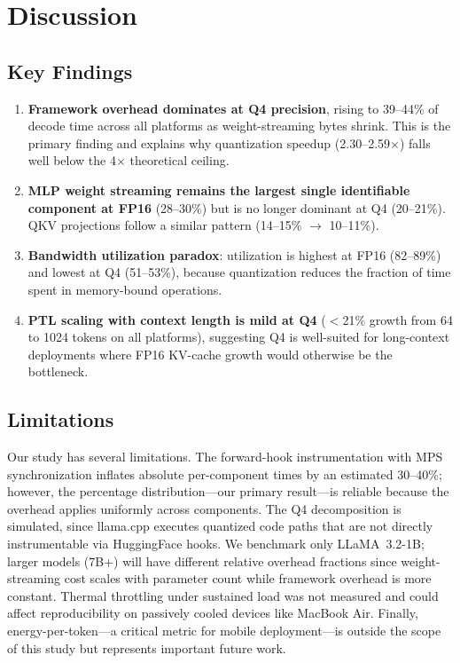 \documentclass[conference]{IEEEtran}
\begin{document}
\section{Discussion}

\subsection{Key Findings}

\begin{enumerate}
  \item \textbf{Framework overhead dominates at Q4 precision}, rising to 39--44\% of decode time across all platforms as weight-streaming bytes shrink. This is the primary finding and explains why quantization speedup (2.30--2.59$\times$) falls well below the 4$\times$ theoretical ceiling.

  \item \textbf{MLP weight streaming remains the largest single identifiable component at FP16} (28--30\%) but is no longer dominant at Q4 (20--21\%). QKV projections follow a similar pattern (14--15\% $\rightarrow$ 10--11\%).

  \item \textbf{Bandwidth utilization paradox}: utilization is highest at FP16 (82--89\%) and lowest at Q4 (51--53\%), because quantization reduces the fraction of time spent in memory-bound operations.

  \item \textbf{PTL scaling with context length is mild at Q4} ($<$21\% growth from 64 to 1024 tokens on all platforms), suggesting Q4 is well-suited for long-context deployments where FP16 KV-cache growth would otherwise be the bottleneck.
\end{enumerate}

\subsection{Limitations}

Our study has several limitations. The forward-hook instrumentation with MPS synchronization inflates absolute per-component times by an estimated 30--40\%; however, the percentage distribution---our primary result---is reliable because the overhead applies uniformly across components. The Q4 decomposition is simulated, since llama.cpp executes quantized code paths that are not directly instrumentable via HuggingFace hooks. We benchmark only LLaMA~3.2-1B; larger models (7B+) will have different relative overhead fractions since weight-streaming cost scales with parameter count while framework overhead is more constant. Thermal throttling under sustained load was not measured and could affect reproducibility on passively cooled devices like MacBook Air. Finally, energy-per-token---a critical metric for mobile deployment---is outside the scope of this study but represents important future work.
\end{document}
